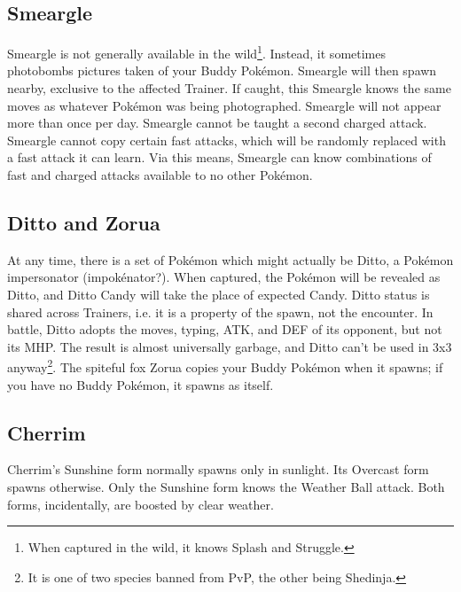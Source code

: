 \subsection{Smeargle\label{subsec:smeargle}}
Smeargle is not generally available in the wild\footnote{When captured in the wild, it knows Splash and Struggle.}.
Instead, it sometimes photobombs pictures taken of your Buddy Pokémon.
Smeargle will then spawn nearby, exclusive to the affected Trainer.
If caught, this Smeargle knows the same moves as whatever Pokémon was being photographed.
Smeargle will not appear more than once per day.
Smeargle cannot be taught a second charged attack.
Smeargle cannot copy certain fast attacks, which will be randomly replaced with
 a fast attack it can learn.
Via this means, Smeargle can know combinations of fast and charged attacks available
 to no other Pokémon.

\subsection{Ditto and Zorua\label{subsec:ditto}}
At any time, there is a set of Pokémon which might actually be Ditto,
  a Pokémon impersonator (impokénator?).
When captured, the Pokémon will be revealed as Ditto, and Ditto Candy will take
  the place of expected Candy.
Ditto status is shared across Trainers, i.e. it is a property of the spawn, not the encounter.
In battle, Ditto adopts the moves, typing, ATK, and DEF of its opponent, but not its MHP\@.
The result is almost universally garbage, and Ditto can't be used in 3x3 anyway\footnote{It is one of two species banned from PvP, the other being Shedinja.}.
The spiteful fox Zorua copies your Buddy Pokémon when it spawns; if you have no Buddy
  Pokémon, it spawns as itself.

\subsection{Cherrim}
Cherrim's Sunshine form normally spawns only in sunlight.
Its Overcast form spawns otherwise.
Only the Sunshine form knows the Weather Ball attack.
Both forms, incidentally, are boosted by clear weather.

